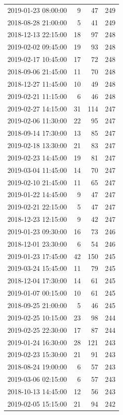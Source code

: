 \begin{tabular}{lrrr}
2019-01-23 08:00:00 & 9 & 47 & 249 \\
2018-08-28 21:00:00 & 5 & 41 & 249 \\
2018-12-13 22:15:00 & 18 & 97 & 248 \\
2019-02-02 09:45:00 & 19 & 93 & 248 \\
2019-02-17 10:45:00 & 17 & 72 & 248 \\
2018-09-06 21:45:00 & 11 & 70 & 248 \\
2018-12-27 11:45:00 & 10 & 49 & 248 \\
2019-02-21 11:15:00 & 6 & 46 & 248 \\
2019-02-27 14:15:00 & 31 & 114 & 247 \\
2019-02-06 11:30:00 & 22 & 95 & 247 \\
2018-09-14 17:30:00 & 13 & 85 & 247 \\
2019-02-18 13:30:00 & 21 & 83 & 247 \\
2019-02-23 14:45:00 & 19 & 81 & 247 \\
2019-03-04 11:45:00 & 14 & 70 & 247 \\
2019-02-10 21:45:00 & 11 & 65 & 247 \\
2019-01-22 14:45:00 & 9 & 47 & 247 \\
2019-02-21 22:15:00 & 5 & 47 & 247 \\
2018-12-23 12:15:00 & 9 & 42 & 247 \\
2019-01-23 09:30:00 & 16 & 73 & 246 \\
2018-12-01 23:30:00 & 6 & 54 & 246 \\
2019-01-23 17:45:00 & 42 & 150 & 245 \\
2019-03-24 15:45:00 & 11 & 79 & 245 \\
2018-12-04 17:30:00 & 14 & 61 & 245 \\
2019-01-07 00:15:00 & 10 & 61 & 245 \\
2018-09-25 21:00:00 & 5 & 46 & 245 \\
2019-02-25 10:15:00 & 23 & 98 & 244 \\
2019-02-25 22:30:00 & 17 & 87 & 244 \\
2019-01-24 16:30:00 & 28 & 121 & 243 \\
2019-02-23 15:30:00 & 21 & 91 & 243 \\
2018-08-24 19:00:00 & 6 & 57 & 243 \\
2019-03-06 02:15:00 & 6 & 57 & 243 \\
2018-10-13 14:45:00 & 12 & 56 & 243 \\
2019-02-05 15:15:00 & 21 & 94 & 242 \\

\end{tabular}
